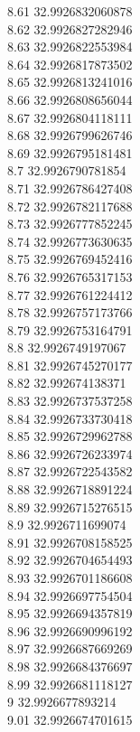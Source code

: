 {8.61	32.9926832060878\\
8.62	32.9926827282946\\
8.63	32.9926822553984\\
8.64	32.9926817873502\\
8.65	32.9926813241016\\
8.66	32.9926808656044\\
8.67	32.9926804118111\\
8.68	32.9926799626746\\
8.69	32.9926795181481\\
8.7	32.9926790781854\\
8.71	32.9926786427408\\
8.72	32.9926782117688\\
8.73	32.9926777852245\\
8.74	32.9926773630635\\
8.75	32.9926769452416\\
8.76	32.9926765317153\\
8.77	32.9926761224412\\
8.78	32.9926757173766\\
8.79	32.9926753164791\\
8.8	32.9926749197067\\
8.81	32.9926745270177\\
8.82	32.992674138371\\
8.83	32.9926737537258\\
8.84	32.9926733730418\\
8.85	32.9926729962788\\
8.86	32.9926726233974\\
8.87	32.9926722543582\\
8.88	32.9926718891224\\
8.89	32.9926715276515\\
8.9	32.9926711699074\\
8.91	32.9926708158525\\
8.92	32.9926704654493\\
8.93	32.9926701186608\\
8.94	32.9926697754504\\
8.95	32.9926694357819\\
8.96	32.9926690996192\\
8.97	32.9926687669269\\
8.98	32.9926684376697\\
8.99	32.9926681118127\\
9	32.9926677893214\\
9.01	32.9926674701615\\
}
